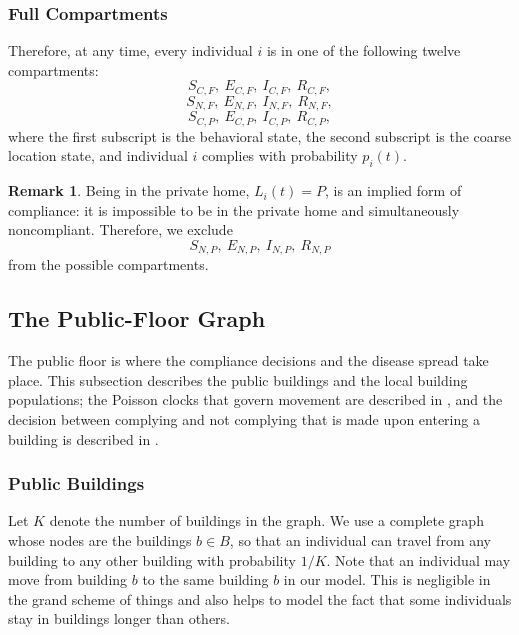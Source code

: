 \documentclass[11pt]{article}
\theoremstyle{definition}
\newtheorem{remark}{Remark}[section]
\theoremstyle{plain}
\begin{document}
\subsubsection{Full Compartments}

Therefore, at any time, every individual $i$ is in one of the following twelve compartments:
\[
S_{C,F},\ E_{C,F},\ I_{C,F},\ R_{C,F},
\]
\[
S_{N,F},\ E_{N,F},\ I_{N,F},\ R_{N,F},
\]
\[
S_{C,P},\ E_{C,P},\ I_{C,P},\ R_{C,P},
\]
where the first subscript is the behavioral state, the second subscript is the coarse location state, and individual $i$ complies with probability $p_i(t)$.

\begin{remark}
Being in the private home, $L_i(t) = P$, is an implied form of compliance: it is impossible to be in the private home and simultaneously noncompliant. Therefore, we exclude
\[
S_{N,P},\ E_{N,P},\ I_{N,P},\ R_{N,P}
\]
from the possible compartments.
\end{remark}


\subsection{The Public-Floor Graph}
\label{sec:graph}

The public floor is where the compliance decisions and the disease spread take place. This subsection describes the public buildings and the local building populations; the Poisson clocks that govern movement are described in , and the decision between complying and not complying that is made upon entering a building is described in .

\subsubsection{Public Buildings}

Let $K$ denote the number of buildings in the graph. We use a complete graph whose nodes are the buildings $b \in B$, so that an individual can travel from any building to any other building with probability $1/K$. Note that an individual may move from building $b$ to the same building $b$ in our model. This is negligible in the grand scheme of things and also helps to model the fact that some individuals stay in buildings longer than others.
\end{document}
